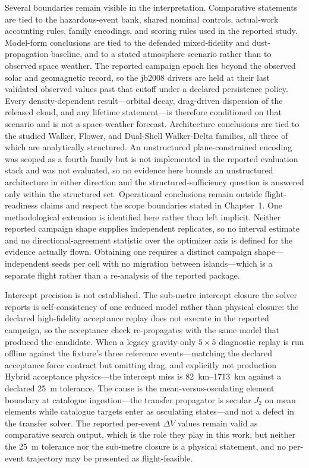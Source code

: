 Several boundaries remain visible in the interpretation. Comparative statements are tied to the hazardous-event bank, shared nominal controls, actual-work accounting rules, family encodings, and scoring rules used in the reported study. Model-form conclusions are tied to the defended mixed-fidelity and dust-propagation baseline, and to a stated atmosphere scenario rather than to observed space weather. The reported campaign epoch lies beyond the observed solar and geomagnetic record, so the \gls{jb2008} drivers are held at their last validated observed values past that cutoff under a declared persistence policy. Every density-dependent result---orbital decay, drag-driven dispersion of the released cloud, and any lifetime statement---is therefore conditioned on that scenario and is not a space-weather forecast. Architecture conclusions are tied to the studied Walker, Flower, and Dual-Shell Walker-Delta families, all three of which are analytically structured. An unstructured plane-constrained encoding was scoped as a fourth family but is not implemented in the reported evaluation stack and was not evaluated, so no evidence here bounds an unstructured architecture in either direction and the structured-sufficiency question is answered only within the structured set. Operational conclusions remain outside flight-readiness claims and respect the scope boundaries stated in Chapter~1. One methodological extension is identified here rather than left implicit. Neither reported campaign shape supplies independent replicates, so no interval estimate and no directional-agreement statistic over the optimizer axis is defined for the evidence actually flown. Obtaining one requires a distinct campaign shape---independent seeds per cell with no migration between islands---which is a separate flight rather than a re-analysis of the reported package.

Intercept precision is not established. The sub-metre intercept closure the solver reports is self-consistency of one reduced model rather than physical closure: the declared high-fidelity acceptance replay does not execute in the reported campaign, so the acceptance check re-propagates with the same model that produced the candidate. When a legacy gravity-only \(5\times5\) diagnostic replay is run offline against the fixture's three reference events---matching the declared acceptance force contract but omitting drag, and explicitly not production Hybrid acceptance physics---the intercept miss is \SIrange{82}{1713}{\kilo\metre} against a declared \SI{25}{\metre} tolerance. The cause is the mean-versus-osculating element boundary at catalogue ingestion---the transfer propagator is secular \(J_2\) on mean elements while catalogue targets enter as osculating states---and not a defect in the transfer solver. The reported per-event \(\Delta V\) values remain valid as comparative search output, which is the role they play in this work, but neither the \SI{25}{\metre} tolerance nor the sub-metre closure is a physical statement, and no per-event trajectory may be presented as flight-feasible.

